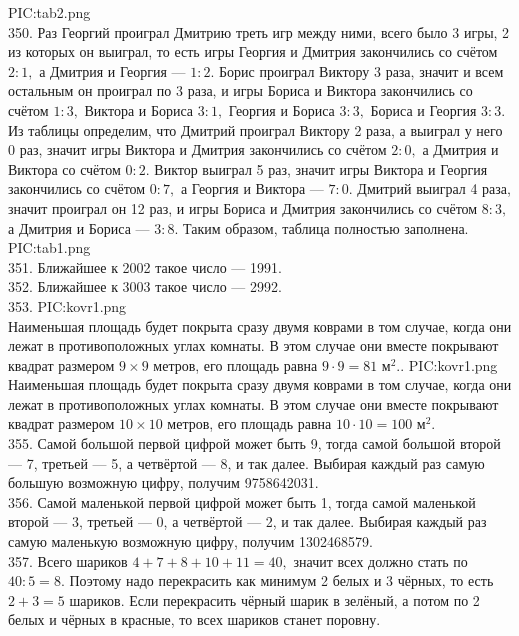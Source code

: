 {{PIC:tab2.png}}\\
350. Раз Георгий проиграл Дмитрию треть игр между ними, всего было 3 игры, 2 из которых он выиграл, то есть игры Георгия и Дмитрия закончились со счётом $2:1,$ а Дмитрия и Георгия --- $1:2.$ Борис проиграл Виктору 3 раза, значит и всем остальным он проиграл по 3 раза, и игры Бориса и Виктора закончились со счётом $1:3,$ Виктора и Бориса $3:1,$ Георгия и Бориса $3:3,$ Бориса и Георгия $3:3.$ Из таблицы определим, что Дмитрий проиграл Виктору 2 раза, а выиграл у него 0 раз, значит игры Виктора и Дмитрия закончились со счётом $2:0,$ а Дмитрия и Виктора со счётом $0:2.$ Виктор выиграл 5 раз, значит игры Виктора и Георгия закончились со счётом $0:7,$ а Георгия и Виктора --- $7:0.$ Дмитрий выиграл 4 раза, значит проиграл он 12 раз, и игры Бориса и Дмитрия закончились со счётом $8:3,$ а Дмитрия и Бориса --- $3:8.$ Таким образом, таблица полностью заполнена.\\
{{PIC:tab1.png}}\\
351. Ближайшее к 2002 такое число --- 1991.\\
352. Ближайшее к 3003 такое число --- 2992.\\
353. {{PIC:kovr1.png}}\\
Наименьшая площадь будет покрыта сразу двумя коврами в том случае, когда они лежат в противоположных углах комнаты. В этом случае они вместе покрывают квадрат размером $9\times9$ метров, его площадь равна $9\cdot9=81\text{ м}^2.$\newpage{}. {{PIC:kovr1.png}}\\
Наименьшая площадь будет покрыта сразу двумя коврами в том случае, когда они лежат в противоположных углах комнаты. В этом случае они вместе покрывают квадрат размером $10\times10$ метров, его площадь равна $10\cdot10=100\text{ м}^2.$\\
355. Самой большой первой цифрой может быть 9, тогда самой большой второй --- 7, третьей --- 5, а четвёртой --- 8, и так далее. Выбирая каждый раз самую большую возможную цифру, получим 9758642031.\\
356. Самой маленькой первой цифрой может быть 1, тогда самой маленькой второй --- 3, третьей --- 0, а четвёртой --- 2, и так далее. Выбирая каждый раз самую маленькую возможную цифру, получим 1302468579.\\
357. Всего шариков $4+7+8+10+11=40,$ значит всех должно стать по $40:5=8.$ Поэтому надо перекрасить как минимум 2 белых и 3 чёрных, то есть $2+3=5$ шариков. Если перекрасить чёрный шарик в зелёный, а потом по 2 белых и чёрных в красные, то всех шариков станет поровну.\\
